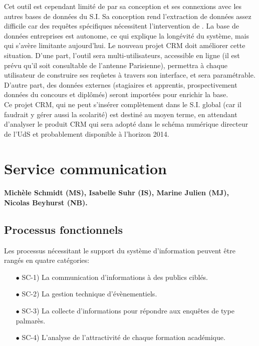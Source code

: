 \documentclass{book}
\begin{document}
Cet outil est cependant limité de par sa conception et ses connexions
avec les autres bases de données du S.I. Sa conception rend l'extraction
de données assez difficile car des requêtes spécifiques nécessitent 
l'intervention de \CK. La base de données entreprises est autonome, ce
qui explique la longévité du système, mais qui s'avère limitante aujourd'hui.
Le nouveau projet CRM doit améliorer cette situation. D'une part, l'outil
sera multi-utilisateurs, accessible en ligne (il est prévu qu'il soit 
consultable de l'antenne Parisienne), permettra à chaque utilisateur de 
construire ses reqûetes à travers son interface, et sera paramétrable. 
D'autre part, des données externes (stagiaires et apprentis, prospectivement 
données du concours et diplômés) seront importées pour enrichir la base.\\

Ce projet CRM, qui ne peut s'insérer complètement dans le S.I. global
(car il faudrait y gérer aussi la scolarité) est destiné au moyen terme,
en attendant d'analyser le produit CRM qui sera adopté dans le schéma
numérique directeur de l'UdS et probablement disponible à l'horizon 2014. 

  

\section{Service communication}

\paragraph{Michèle Schmidt (MS), Isabelle Suhr (IS), Marine Julien (MJ), 
Nicolas Beyhurst (NB).}

\subsection{Processus fonctionnels}
Les processus nécessitant le support du système d'information peuvent 
être rangés en quatre catégories:
\begin{itemize}
\item[$\bullet$] SC-1) La communication d'informations à des publics ciblés.
\item[$\bullet$] SC-2) La gestion technique d'évènementiels.
\item[$\bullet$] SC-3) La collecte d'informations pour répondre aux enquêtes de type 
      palmarès.
\item[$\bullet$] SC-4) L'analyse de l'attractivité de chaque formation académique.
\end{itemize}
\bigskip
\end{document}
